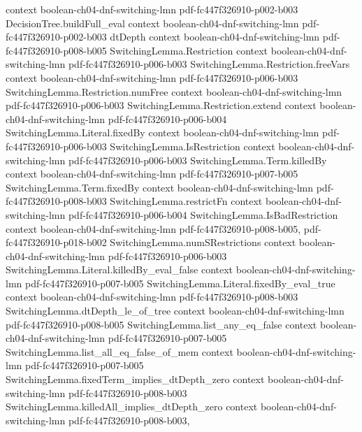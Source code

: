 \begin{lemma}
  {context}
  {boolean-ch04-dnf-switching-lmn}
  {pdf-fc447f326910-p002-b003}
\proofstep
  {DecisionTree.buildFull_eval}
  {context}
  {boolean-ch04-dnf-switching-lmn}
  {pdf-fc447f326910-p002-b003}
\proofstep
  {dtDepth}
  {context}
  {boolean-ch04-dnf-switching-lmn}
  {pdf-fc447f326910-p008-b005}
\proofstep
  {SwitchingLemma.Restriction}
  {context}
  {boolean-ch04-dnf-switching-lmn}
  {pdf-fc447f326910-p006-b003}
\proofstep
  {SwitchingLemma.Restriction.freeVars}
  {context}
  {boolean-ch04-dnf-switching-lmn}
  {pdf-fc447f326910-p006-b003}
\proofstep
  {SwitchingLemma.Restriction.numFree}
  {context}
  {boolean-ch04-dnf-switching-lmn}
  {pdf-fc447f326910-p006-b003}
\proofstep
  {SwitchingLemma.Restriction.extend}
  {context}
  {boolean-ch04-dnf-switching-lmn}
  {pdf-fc447f326910-p006-b004}
\proofstep
  {SwitchingLemma.Literal.fixedBy}
  {context}
  {boolean-ch04-dnf-switching-lmn}
  {pdf-fc447f326910-p006-b003}
\proofstep
  {SwitchingLemma.IsRestriction}
  {context}
  {boolean-ch04-dnf-switching-lmn}
  {pdf-fc447f326910-p006-b003}
\proofstep
  {SwitchingLemma.Term.killedBy}
  {context}
  {boolean-ch04-dnf-switching-lmn}
  {pdf-fc447f326910-p007-b005}
\proofstep
  {SwitchingLemma.Term.fixedBy}
  {context}
  {boolean-ch04-dnf-switching-lmn}
  {pdf-fc447f326910-p008-b003}
\proofstep
  {SwitchingLemma.restrictFn}
  {context}
  {boolean-ch04-dnf-switching-lmn}
  {pdf-fc447f326910-p006-b004}
\proofstep
  {SwitchingLemma.IsBadRestriction}
  {context}
  {boolean-ch04-dnf-switching-lmn}
  {pdf-fc447f326910-p008-b005,
    pdf-fc447f326910-p018-b002}
\proofstep
  {SwitchingLemma.numSRestrictions}
  {context}
  {boolean-ch04-dnf-switching-lmn}
  {pdf-fc447f326910-p006-b003}
\proofstep
  {SwitchingLemma.Literal.killedBy_eval_false}
  {context}
  {boolean-ch04-dnf-switching-lmn}
  {pdf-fc447f326910-p007-b005}
\proofstep
  {SwitchingLemma.Literal.fixedBy_eval_true}
  {context}
  {boolean-ch04-dnf-switching-lmn}
  {pdf-fc447f326910-p008-b003}
\proofstep
  {SwitchingLemma.dtDepth_le_of_tree}
  {context}
  {boolean-ch04-dnf-switching-lmn}
  {pdf-fc447f326910-p008-b005}
\proofstep
  {SwitchingLemma.list_any_eq_false}
  {context}
  {boolean-ch04-dnf-switching-lmn}
  {pdf-fc447f326910-p007-b005}
\proofstep
  {SwitchingLemma.list_all_eq_false_of_mem}
  {context}
  {boolean-ch04-dnf-switching-lmn}
  {pdf-fc447f326910-p007-b005}
\proofstep
  {SwitchingLemma.fixedTerm_implies_dtDepth_zero}
  {context}
  {boolean-ch04-dnf-switching-lmn}
  {pdf-fc447f326910-p008-b003}
\proofstep
  {SwitchingLemma.killedAll_implies_dtDepth_zero}
  {context}
  {boolean-ch04-dnf-switching-lmn}
  {pdf-fc447f326910-p008-b003,
}
\end{lemma}
